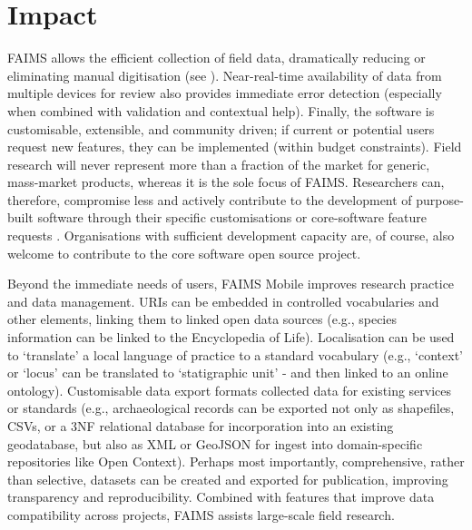 \documentclass[preprint,12pt, a4paper]{elsarticle}
\begin{document}
\section{Impact}
\label{}


FAIMS allows the efficient collection of field data, dramatically reducing or eliminating manual digitisation (see \cite{Sobotkova2016-mx}). Near-real-time availability of data from multiple devices for review also provides immediate error detection (especially when combined with validation and contextual help). Finally, the software is customisable, extensible, and community driven; if current or potential users request new features, they can be implemented (within budget constraints). Field research will never represent more than a fraction of the market for generic, mass-market products, whereas it is the sole focus of FAIMS. Researchers can, therefore, compromise less and actively contribute to the development of purpose-built software through their specific customisations or core-software feature requests \cite{Sobotkova2016-mx}. Organisations with sufficient development capacity are, of course, also welcome to contribute to the core software open source project.

Beyond the immediate needs of users, FAIMS Mobile improves research practice and data management. URIs can be embedded in controlled vocabularies and other elements\cite{Sobotkova2015-lq}, linking them to linked open data sources (e.g., species information can be linked to the Encyclopedia of Life\cite{Wilson2003-xx}). Localisation can be used to `translate' a local language of practice to a standard vocabulary (e.g., `context' or `locus' can be translated to `statigraphic unit' - and then linked to an online ontology). Customisable data export formats collected data for existing services or standards (e.g., archaeological records can be exported not only as shapefiles, CSVs, or a 3NF relational database for incorporation into an existing geodatabase, but also as XML or GeoJSON for ingest into domain-specific repositories like Open Context). Perhaps most importantly, comprehensive, rather than selective, datasets can be created and exported for publication, improving transparency and reproducibility. Combined with features that improve data compatibility across projects, FAIMS assists large-scale field research. 
\end{document}
